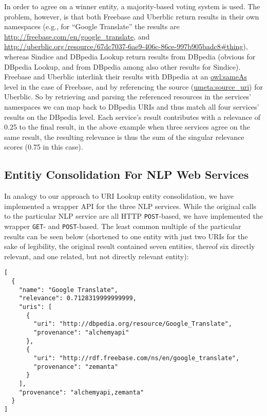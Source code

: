 \documentclass{acm_proc_article-sp}
\begin{document}
In order to agree on a winner entity, a majority-based voting system is used. The problem, however, is that both Freebase and Uberblic return results in their own namespaces (e.g., for ``Google Translate'' the results are \url{http://freebase.com/en/google_translate}, and \url{http://uberblic.org/resource/67dc7037-6ae9-406c-86ce-997b905badc8#thing}), whereas Sindice and DBpedia Lookup return results from DBpedia (obvious for DBpedia Lookup, and from DBpedia among also other results for Sindice). Freebase and Uberblic interlink their results with DBpedia at an \url{owl:sameAs} level in the case of Freebase, and by referencing the source (\url{umeta:source_uri}) for Uberblic. So by retrieving and parsing the referenced resources in the services' namespaces we can map back to DBpedia URIs and thus match all four services' results on the DBpedia level. Each service's result contributes with a relevance of 0.25 to the final result, in the above example when three services agree on the same result, the resulting relevance is thus the sum of the singular relevance scores (0.75 in this case).


\subsection{Entitiy Consolidation For NLP Web Services}\label{sec:consolidation2}
In analogy to our approach to URI Lookup entity consolidation, we have implemented a wrapper API for the three NLP services. While the original calls to the particular NLP service are all HTTP \texttt{POST}-based, we have implemented the wrapper \texttt{GET}- and \texttt{POST}-based. The least common multiple of the particular results can be seen below (shortened to one entity with just two URIs for the sake of legibility, the original result contained seven entities, thereof six directly relevant, and one related, but not directly relevant entity):


\begin{lstlisting}
[ 
  {
    "name": "Google Translate",
    "relevance": 0.7128319999999999,
    "uris": [
      {
        "uri": "http://dbpedia.org/resource/Google_Translate",
        "provenance": "alchemyapi"
      },
      {
        "uri": "http://rdf.freebase.com/ns/en/google_translate",
        "provenance": "zemanta"
      }
    ],
    "provenance": "alchemyapi,zemanta"
  }
]
\end{lstlisting}
\end{document}
